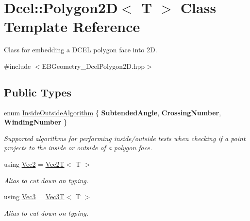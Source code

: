 \hypertarget{classDcel_1_1Polygon2D}{}\section{Dcel\+:\+:Polygon2D$<$ T $>$ Class Template Reference}
\label{classDcel_1_1Polygon2D}


Class for embedding a D\+C\+EL polygon face into 2D.  




{\ttfamily \#include $<$E\+B\+Geometry\+\_\+\+Dcel\+Polygon2\+D.\+hpp$>$}

\subsection*{Public Types}
\begin{DoxyCompactItemize}
\item 
\mbox{\label{classDcel_1_1Polygon2D_a1ec8170036eb8dd1cedbe1b4d31024b4}} 
enum \hyperlink{classDcel_1_1Polygon2D_a1ec8170036eb8dd1cedbe1b4d31024b4}{Inside\+Outside\+Algorithm} \{ {\bfseries Subtended\+Angle}, 
{\bfseries Crossing\+Number}, 
{\bfseries Winding\+Number}
 \}\begin{DoxyCompactList}\small\item\em Supported algorithms for performing inside/outside tests when checking if a point projects to the inside or outside of a polygon face. \end{DoxyCompactList}
\item 
\mbox{\label{classDcel_1_1Polygon2D_ab70ec33cb6418fa0204f0d951dfd01fb}} 
using \hyperlink{classDcel_1_1Polygon2D_ab70ec33cb6418fa0204f0d951dfd01fb}{Vec2} = \hyperlink{classVec2T}{Vec2T}$<$ T $>$
\begin{DoxyCompactList}\small\item\em Alias to cut down on typing. \end{DoxyCompactList}\item 
\mbox{\label{classDcel_1_1Polygon2D_a46e9686210f09464e8f5ad13300717b9}} 
using \hyperlink{classDcel_1_1Polygon2D_a46e9686210f09464e8f5ad13300717b9}{Vec3} = \hyperlink{classVec3T}{Vec3T}$<$ T $>$
\begin{DoxyCompactList}\small\item\em Alias to cut down on typing. \end{DoxyCompactList}\end{DoxyCompactItemize}
